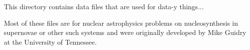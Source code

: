This directory contains data files that are used for data-\/y things...

Most of these files are for nuclear astrophysics problems on nucleosynthesis in supernovae or other such systems and were originally developed by Mike Guidry at the University of Tennessee. 